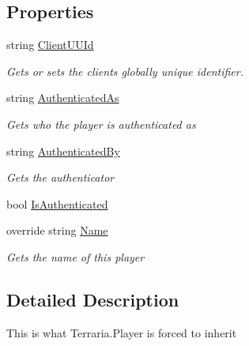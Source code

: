 \subsection*{Properties}
\begin{DoxyCompactItemize}
\item 
string \hyperlink{class_o_t_a_1_1_base_player_adcd3dc1f7dbda92ff30c68f0f34a5325}{Client\+U\+U\+Id}
\begin{DoxyCompactList}\small\item\em Gets or sets the clients globally unique identifier. \end{DoxyCompactList}\item 
string \hyperlink{class_o_t_a_1_1_base_player_aa2c511b2c8c7a81f127e9739aaa317af}{Authenticated\+As}
\begin{DoxyCompactList}\small\item\em Gets who the player is authenticated as \end{DoxyCompactList}\item 
string \hyperlink{class_o_t_a_1_1_base_player_a7a17fe6e70fdced08889b091dbc5fa68}{Authenticated\+By}
\begin{DoxyCompactList}\small\item\em Gets the authenticator \end{DoxyCompactList}\item 
bool \hyperlink{class_o_t_a_1_1_base_player_a7d28034ac6e64c323e8ee3e0aabb0a4a}{Is\+Authenticated}
\item 
override string \hyperlink{class_o_t_a_1_1_base_player_a7f586b5eaa831fe49cccc1062aaa3cc4}{Name}
\begin{DoxyCompactList}\small\item\em Gets the name of this player \end{DoxyCompactList}\end{DoxyCompactItemize}


\subsection{Detailed Description}
This is what Terraria.\+Player is forced to inherit 



